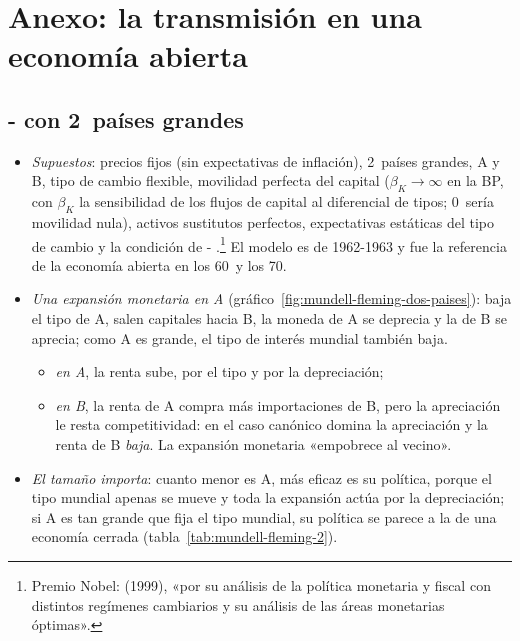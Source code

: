 \documentclass[11pt]{article}
\begin{document}
\section{Anexo: la transmisión en una economía abierta}\label{anexo:abierta}

\subsection*{- con 2~países grandes}
\begin{itemize}
\item \emph{Supuestos}: precios fijos (sin expectativas de inflación), 2~países grandes, A y B, tipo de cambio flexible, movilidad perfecta del capital ($\beta_K\to\infty$ en la BP, con $\beta_K$ la sensibilidad de los flujos de capital al diferencial de tipos; 0~sería movilidad nula), activos sustitutos perfectos, expectativas estáticas del tipo de cambio y la condición de -\nocite{Fleming1962Domestic,Mundell1963Capital} .\footnote{Premio Nobel:  (1999), «por su análisis de la política monetaria y fiscal con distintos regímenes cambiarios y su análisis de las áreas monetarias óptimas»\nocite{Nobel1999Mundell}.} El modelo es de 1962-1963 y fue la referencia de la economía abierta en los 60~y los 70.
\item \emph{Una expansión monetaria en A} (gráfico~\ref{fig:mundell-fleming-dos-paises}): baja el tipo de A, salen capitales hacia B, la moneda de A se deprecia y la de B se aprecia; como A es grande, el tipo de interés mundial también baja.
  \begin{itemize}
  \item \emph{en A}, la renta sube, por el tipo y por la depreciación;
  \item \emph{en B}, la renta de A compra más importaciones de B, pero la apreciación le resta competitividad: en el caso canónico domina la apreciación y la renta de B \emph{baja}. La expansión monetaria «empobrece al vecino»\nocite{Mundell1964Reply}.
  \end{itemize}
\item \emph{El tamaño importa}: cuanto menor es A, más eficaz es su política, porque el tipo mundial apenas se mueve y toda la expansión actúa por la depreciación; si A es tan grande que fija el tipo mundial, su política se parece a la de una economía cerrada (tabla~\ref{tab:mundell-fleming-2}).
\end{itemize}
\end{document}

